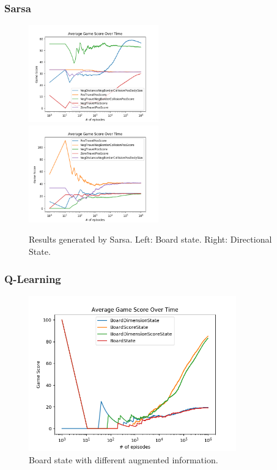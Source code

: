 \documentclass{beamer}
\begin{document}
    \begin{frame}
        \frametitle{Sarsa}
        \begin{figure}
            \includegraphics[width=0.5\textwidth]{../images/sarsa/reward/42/reward_sarsa_board_state_average_game_score_over_time.png}
            \hfill
            \includegraphics[width=0.5\textwidth]{../images/sarsa/reward/42/reward_sarsa_directional_state_average_game_score_over_time.png}
            \caption{Results generated by Sarsa. Left: Board state. Right: Directional State.}
            \label{fig:reward_result_sarsa}
        \end{figure}
    \end{frame}

    \begin{frame}
        \frametitle{Q-Learning}
        \begin{figure}
            \centering
            \includegraphics[width=0.8\textwidth]{../images/qlearning/info_augmentation/123/board_state_average_game_score_over_time.png}
            \caption{Board state with different augmented information.}
            \label{fig:info_augmentation_board_state}
        \end{figure}
    \end{frame}
\end{document}
